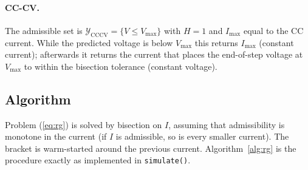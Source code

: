 \documentclass[11pt]{article}
\newcommand{\code}[1]{\texttt{#1}}
\begin{document}
\paragraph{CC-CV.} The admissible set is $\mathcal Y_{\mathrm{CCCV}}=\{V\le V_{\max}\}$ with $H=1$ and $I_{\max}$ equal to the CC current. While the predicted voltage is below $V_{\max}$ this returns $I_{\max}$ (constant current); afterwards it returns the current that places the end-of-step voltage at $V_{\max}$ to within the bisection tolerance (constant voltage).

\subsection{Algorithm}
Problem (\ref{eq:rg}) is solved by bisection on $I$, assuming that admissibility is monotone in the current (if $I$ is admissible, so is every smaller current). The bracket is warm-started around the previous current. Algorithm~\ref{alg:rg} is the procedure exactly as implemented in \code{simulate()}.
\end{document}
